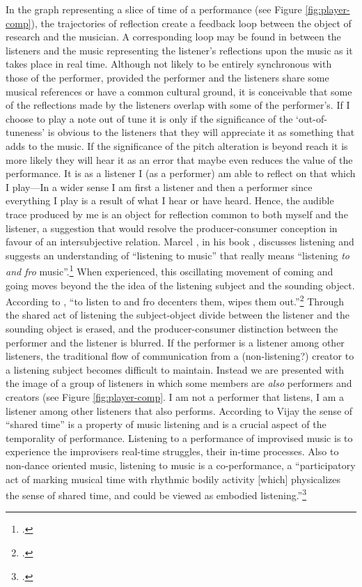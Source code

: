 In the graph representing a slice of time of a performance (see Figure \ref{fig:player-comp}), the trajectories of reflection create a feedback loop between the object of research and the musician. A corresponding loop may be found in between the listeners and the music representing the listener's reflections upon the music as it takes place in real time. Although not likely to be entirely synchronous with those of the performer, provided the performer and the listeners share some musical references or have a common cultural ground, it is conceivable that some of the reflections made by the listeners overlap with some of the performer's. If I choose to play a note out of tune it is only if the significance of the `out-of-tuneness' is obvious to the listeners that they will appreciate it as something that adds to the music. If the significance of the pitch alteration is beyond reach it is more likely they will hear it as an error that maybe even reduces the value of the performance. It is as a listener I (as a performer) am able to reflect on that which I play---In a wider sense I am first a listener and then a performer since everything I play is a result of what I hear or have heard. Hence, the audible trace produced by me is an object for reflection common to both myself and the listener, a suggestion that would resolve the producer-consumer conception in favour of an intersubjective relation. Marcel \citeauthor{cobussen08}, in his book , discusses listening and suggests an understanding of ``listening to music'' that really means ``listening \emph{to and fro} music''.\footcite[p. 135 (italics by the author)]{cobussen08} When experienced, this oscillating movement of coming and going moves beyond the the idea of the listening subject and the sounding object. According to \citeauthor{cobussen08}, ``to listen to and fro decenters them, wipes them out.''\footcite[135]{cobussen08} Through the shared act of listening the subject-object divide between the listener and the sounding object is erased, and the producer-consumer distinction between the performer and the listener is blurred. 
If the performer is a listener among other listeners, the traditional flow of communication from a (non-listening?) creator to a listening subject becomes difficult to maintain. Instead we are presented with the image of a group of listeners in which some members are \emph{also} performers and creators (see Figure \ref{fig:player-comp}. I am not a performer that listens, I am a listener among other listeners that also performs. According to Vijay \citeauthor{iyer08} the sense of ``shared time'' is a property of music listening and is a crucial aspect of the temporality of performance. Listening to a performance of improvised music is to experience the improvisers real-time struggles, their in-time processes. Also to non-dance oriented music, listening to music is a co-performance, a ``participatory act of marking musical time with rhythmic bodily activity [which] physicalizes the sense of shared time, and could be viewed as embodied listening.''\footcite[276]{iyer08} 

